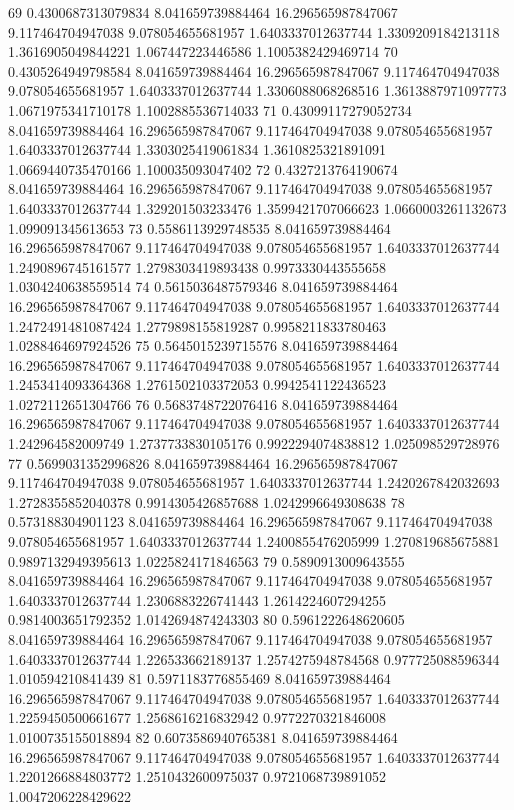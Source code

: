{69 0.4300687313079834 8.041659739884464 16.296565987847067 9.117464704947038 9.078054655681957 1.6403337012637744 1.3309209184213118 1.3616905049844221 1.067447223446586 1.1005382429469714
70 0.4305264949798584 8.041659739884464 16.296565987847067 9.117464704947038 9.078054655681957 1.6403337012637744 1.3306088068268516 1.3613887971097773 1.0671975341710178 1.1002885536714033
71 0.43099117279052734 8.041659739884464 16.296565987847067 9.117464704947038 9.078054655681957 1.6403337012637744 1.3303025419061834 1.3610825321891091 1.0669440735470166 1.100035093047402
72 0.4327213764190674 8.041659739884464 16.296565987847067 9.117464704947038 9.078054655681957 1.6403337012637744 1.329201503233476 1.3599421707066623 1.0660003261132673 1.099091345613653
73 0.5586113929748535 8.041659739884464 16.296565987847067 9.117464704947038 9.078054655681957 1.6403337012637744 1.2490896745161577 1.2798303419893438 0.9973330443555658 1.0304240638559514
74 0.5615036487579346 8.041659739884464 16.296565987847067 9.117464704947038 9.078054655681957 1.6403337012637744 1.2472491481087424 1.2779898155819287 0.9958211833780463 1.0288464697924526
75 0.5645015239715576 8.041659739884464 16.296565987847067 9.117464704947038 9.078054655681957 1.6403337012637744 1.2453414093364368 1.2761502103372053 0.9942541122436523 1.0272112651304766
76 0.5683748722076416 8.041659739884464 16.296565987847067 9.117464704947038 9.078054655681957 1.6403337012637744 1.242964582009749 1.2737733830105176 0.9922294074838812 1.025098529728976
77 0.5699031352996826 8.041659739884464 16.296565987847067 9.117464704947038 9.078054655681957 1.6403337012637744 1.2420267842032693 1.2728355852040378 0.9914305426857688 1.0242996649308638
78 0.573188304901123 8.041659739884464 16.296565987847067 9.117464704947038 9.078054655681957 1.6403337012637744 1.2400855476205999 1.270819685675881 0.9897132949395613 1.0225824171846563
79 0.5890913009643555 8.041659739884464 16.296565987847067 9.117464704947038 9.078054655681957 1.6403337012637744 1.2306883226741443 1.2614224607294255 0.9814003651792352 1.0142694874243303
80 0.5961222648620605 8.041659739884464 16.296565987847067 9.117464704947038 9.078054655681957 1.6403337012637744 1.226533662189137 1.2574275948784568 0.977725088596344 1.010594210841439
81 0.5971183776855469 8.041659739884464 16.296565987847067 9.117464704947038 9.078054655681957 1.6403337012637744 1.2259450500661677 1.2568616216832942 0.9772270321846008 1.0100735155018894
82 0.6073586940765381 8.041659739884464 16.296565987847067 9.117464704947038 9.078054655681957 1.6403337012637744 1.2201266884803772 1.2510432600975037 0.9721068739891052 1.0047206228429622
}
